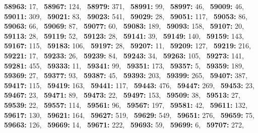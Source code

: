 \textbf{58963:} 17,\allowbreak~ 
\textbf{58967:} 124,\allowbreak~ 
\textbf{58979:} 371,\allowbreak~ 
\textbf{58991:} 99,\allowbreak~ 
\textbf{58997:} 46,\allowbreak~ 
\textbf{59009:} 46,\allowbreak~ 
\textbf{59011:} 309,\allowbreak~ 
\textbf{59021:} 83,\allowbreak~ 
\textbf{59023:} 541,\allowbreak~ 
\textbf{59029:} 28,\allowbreak~ 
\textbf{59051:} 117,\allowbreak~ 
\textbf{59053:} 86,\allowbreak~ 
\textbf{59063:} 66,\allowbreak~ 
\textbf{59069:} 87,\allowbreak~ 
\textbf{59077:} 60,\allowbreak~ 
\textbf{59083:} 189,\allowbreak~ 
\textbf{59093:} 158,\allowbreak~ 
\textbf{59107:} 20,\allowbreak~ 
\textbf{59113:} 28,\allowbreak~ 
\textbf{59119:} 52,\allowbreak~ 
\textbf{59123:} 28,\allowbreak~ 
\textbf{59141:} 39,\allowbreak~ 
\textbf{59149:} 140,\allowbreak~ 
\textbf{59159:} 143,\allowbreak~ 
\textbf{59167:} 115,\allowbreak~ 
\textbf{59183:} 106,\allowbreak~ 
\textbf{59197:} 28,\allowbreak~ 
\textbf{59207:} 11,\allowbreak~ 
\textbf{59209:} 127,\allowbreak~ 
\textbf{59219:} 216,\allowbreak~ 
\textbf{59221:} 17,\allowbreak~ 
\textbf{59233:} 26,\allowbreak~ 
\textbf{59239:} 84,\allowbreak~ 
\textbf{59243:} 34,\allowbreak~ 
\textbf{59263:} 105,\allowbreak~ 
\textbf{59273:} 141,\allowbreak~ 
\textbf{59281:} 455,\allowbreak~ 
\textbf{59333:} 11,\allowbreak~ 
\textbf{59341:} 99,\allowbreak~ 
\textbf{59351:} 173,\allowbreak~ 
\textbf{59357:} 5,\allowbreak~ 
\textbf{59359:} 189,\allowbreak~ 
\textbf{59369:} 27,\allowbreak~ 
\textbf{59377:} 93,\allowbreak~ 
\textbf{59387:} 45,\allowbreak~ 
\textbf{59393:} 203,\allowbreak~ 
\textbf{59399:} 265,\allowbreak~ 
\textbf{59407:} 387,\allowbreak~ 
\textbf{59417:} 115,\allowbreak~ 
\textbf{59419:} 163,\allowbreak~ 
\textbf{59441:} 117,\allowbreak~ 
\textbf{59443:} 476,\allowbreak~ 
\textbf{59447:} 269,\allowbreak~ 
\textbf{59453:} 23,\allowbreak~ 
\textbf{59467:} 23,\allowbreak~ 
\textbf{59471:} 89,\allowbreak~ 
\textbf{59473:} 22,\allowbreak~ 
\textbf{59497:} 153,\allowbreak~ 
\textbf{59509:} 38,\allowbreak~ 
\textbf{59513:} 27,\allowbreak~ 
\textbf{59539:} 22,\allowbreak~ 
\textbf{59557:} 114,\allowbreak~ 
\textbf{59561:} 96,\allowbreak~ 
\textbf{59567:} 197,\allowbreak~ 
\textbf{59581:} 42,\allowbreak~ 
\textbf{59611:} 132,\allowbreak~ 
\textbf{59617:} 130,\allowbreak~ 
\textbf{59621:} 164,\allowbreak~ 
\textbf{59627:} 519,\allowbreak~ 
\textbf{59629:} 549,\allowbreak~ 
\textbf{59651:} 276,\allowbreak~ 
\textbf{59659:} 75,\allowbreak~ 
\textbf{59663:} 126,\allowbreak~ 
\textbf{59669:} 14,\allowbreak~ 
\textbf{59671:} 222,\allowbreak~ 
\textbf{59693:} 59,\allowbreak~ 
\textbf{59699:} 6,\allowbreak~ 
\textbf{59707:} 272,\allowbreak~ 
